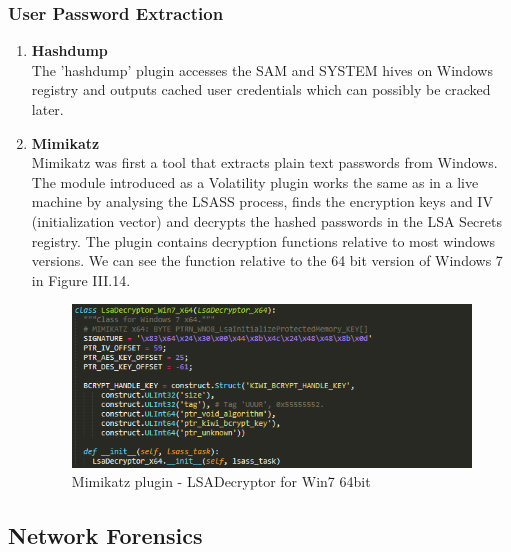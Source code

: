 \subsubsection{User Password Extraction}
\begin{enumerate}[label=(\alph*)]
    \item \textbf{Hashdump}\\
    The 'hashdump' plugin accesses the SAM and SYSTEM hives on Windows registry and outputs cached user credentials which can possibly be cracked later.
    \item \textbf{Mimikatz}\\
    Mimikatz was first a tool that extracts plain text passwords from Windows. The module introduced as a Volatility plugin works the same as in a live machine by analysing the LSASS process, finds the encryption keys and IV (initialization vector) and decrypts the hashed passwords in the LSA Secrets registry. The plugin contains decryption functions relative to most windows versions. We can see the function relative to the 64 bit version of Windows 7 in Figure III.14.
    \begin{figure}[H]
    \centering
    \includegraphics[width=0.8\columnwidth]{Figures/mimikatz.png}
    \caption{Mimikatz plugin - LSADecryptor for Win7 64bit}
    \end{figure}
\end{enumerate}


\subsection{Network Forensics}
